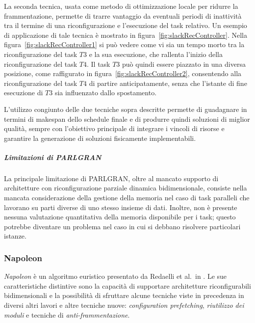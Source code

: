 La seconda tecnica, usata come metodo di ottimizzazione locale per ridurre la 
frammentazione, permette di trarre vantaggio da eventuali periodi di inattività 
tra il termine di una riconfigurazione e l'esecuzione del task relativo. Un 
esempio di applicazione di tale tecnica è mostrato in figura~\ref{fig:slackRecController}.
Nella figura~\ref{fig:slackRecController1} si può 
vedere come vi sia un tempo morto tra la riconfigurazione del task $T3$ e la sua 
esecuzione, che rallenta l'inizio della riconfigurazione del task $T4$. Il task 
$T3$ può quindi essere piazzato in una diversa posizione, come raffigurato in 
figura~\ref{fig:slackRecController2}, consentendo alla riconfigurazione del task 
$T4$ di partire anticipatamente, senza che l'istante di fine esecuzione di $T3$ 
sia influenzato dallo spostamento.



L'utilizzo congiunto delle due tecniche sopra descritte permette di guadagnare 
in termini di makespan dello schedule finale e di produrre quindi soluzioni di 
miglior qualità, sempre con l'obiettivo principale di integrare i vincoli di 
risorse e garantire la generazione di soluzioni fisicamente implementabili.


\subparagraph{Limitazioni di PARLGRAN}
La principale limitazione di PARLGRAN, oltre al mancato supporto di 
architetture con riconfigurazione parziale dinamica bidimensionale, consiste 
nella mancata considerazione della gestione della memoria nel caso di task 
paralleli che lavorano su parti diverse di uno stesso insieme di dati. Inoltre, 
non è presente nessuna valutazione quantitativa della memoria disponibile per 
i task; questo potrebbe diventare un problema nel caso in cui si debbano 
risolvere particolari istanze.


\subsubsection{Napoleon}
\emph{Napoleon} è un algoritmo euristico presentato da Redaelli et al.~in 
\cite{Redaelli2DILP}. Le sue caratteristiche distintive sono la capacità di 
supportare architetture riconfigurabili bidimensionali e la possibilità di 
sfruttare alcune tecniche viste in precedenza in diversi altri lavori e altre 
tecniche nuove: \emph{configuration prefetching}, \emph{riutilizzo dei moduli} e 
tecniche di \emph{anti-frammentazione}.

